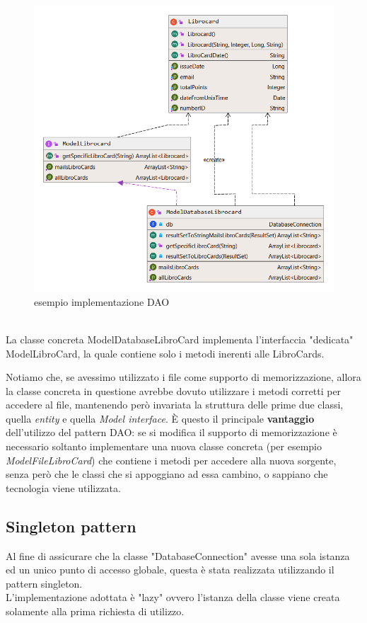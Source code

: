 \documentclass[a4paper,11pt]{report}
\begin{document}
\begin{figure}[h!]
    	\centering
    	\includegraphics[width=1\linewidth]{Class diagrams/Librocard.png}
    	\caption{esempio implementazione DAO}
\end{figure} \leavevmode \\

La classe concreta ModelDatabaseLibroCard implementa l'interfaccia "dedicata" ModelLibroCard, la quale contiene solo i metodi inerenti alle LibroCards.

Notiamo che, se avessimo utilizzato i file come supporto di memorizzazione, allora la classe concreta in questione avrebbe dovuto utilizzare i metodi corretti per accedere al file, mantenendo però invariata la struttura delle prime due classi, quella \textit{entity} e quella \textit{Model interface}. È questo il principale \textbf{vantaggio} dell'utilizzo del pattern DAO: se si modifica il supporto di memorizzazione è necessario soltanto implementare una nuova classe concreta (per esempio \textit{ModelFileLibroCard}) che contiene i metodi per accedere alla nuova sorgente, senza però che le classi che si appoggiano ad essa cambino, o sappiano che tecnologia viene utilizzata.

\subsection{Singleton pattern}
Al fine di assicurare che la classe "DatabaseConnection" avesse una sola istanza ed un unico punto di accesso globale, questa è stata realizzata utilizzando il pattern singleton.\\
L'implementazione adottata è "lazy" ovvero l'istanza della classe viene creata solamente alla prima richiesta di utilizzo.\\
\end{document}
